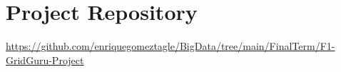 \documentclass{article}
\begin{document}


\section{Project Repository}
\url{https://github.com/enriquegomeztagle/BigData/tree/main/FinalTerm/F1-GridGuru-Project}

\label{sec:references}
\begin{thebibliography}{9}

\end{thebibliography}
\end{document}
